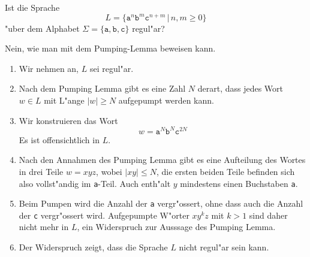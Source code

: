 Ist die Sprache
\[
L=\{ \texttt{a}^n\texttt{b}^m\texttt{c}^{n+m}\,|\,n,m\ge 0\}
\]
"uber dem Alphabet $\Sigma= \{\texttt{a},\texttt{b},\texttt{c}\}$
regul"ar?

\begin{loesung}
Nein, wie man mit dem Pumping-Lemma beweisen kann.
\begin{enumerate}
\item
Wir nehmen an, $L$ sei regul"ar.
\item
Nach dem Pumping Lemma gibt es eine Zahl $N$ derart, dass jedes
Wort $w\in L$ mit L"ange $|w|\ge N$ aufgepumpt werden kann.
\item
Wir konstruieren das Wort
\[
w=\texttt{a}^N\texttt{b}^N\texttt{c}^{2N}
\]
Es ist offensichtlich in $L$.
\item
Nach den Annahmen des Pumping Lemma gibt es eine Aufteilung des
Wortes in drei Teile $w=xyz$, wobei $|xy|\le N$, die ersten beiden
Teile befinden sich also vollst"andig im \texttt{a}-Teil.
Auch enth"alt $y$ mindestens einen Buchstaben \texttt{a}.
\item
Beim Pumpen wird die Anzahl der \texttt{a} vergr"ossert, ohne dass auch
die Anzahl der \texttt{c} vergr"ossert wird.
Aufgepumpte W"orter $xy^kz$ mit $k>1$ sind daher nicht mehr in $L$,
ein Widerspruch zur Ausssage des Pumping Lemma.
\item 
Der Widerspruch zeigt, dass die Sprache $L$ nicht regul"ar sein kann.
\qedhere
\end{enumerate}
\end{loesung}

\begin{bewertung}
\end{bewertung}

